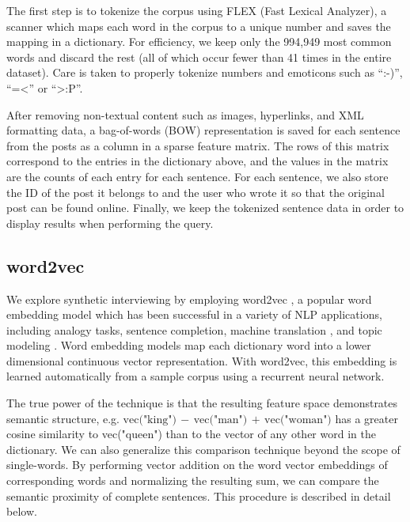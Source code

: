 \documentclass{sigchi}
\begin{document}
The first step is to tokenize the corpus using FLEX (Fast Lexical Analyzer), a scanner which maps each word in the corpus to a unique number and saves the mapping in a dictionary. For efficiency, we keep only the 994,949 most common words and discard the rest (all of which occur fewer than 41 times in the entire dataset). Care is taken to properly tokenize numbers and emoticons such as ``:-)'', ``=<'' or ``>:P''.

After removing non-textual content such as images, hyperlinks, and XML formatting data, a bag-of-words (BOW) representation is saved for each sentence from the posts as a column in a sparse feature matrix. The rows of this matrix correspond to the entries in the dictionary above, and the values in the matrix are the counts of each entry for each sentence. For each sentence, we also store the ID of the post it belongs to and the user who wrote it so that the original post can be found online. Finally, we keep the tokenized sentence data in order to display results when performing the query.


\subsection{word2vec}
We explore synthetic interviewing by employing word2vec \cite{Mikolov2013,MikolovSCCD13}, a popular word embedding model which has been successful in a variety of NLP applications, including analogy tasks, sentence completion, machine translation \cite{W15-4908}, and topic modeling \cite{djuric2015hierarchical}. Word embedding models map each dictionary word into a lower dimensional continuous vector representation. With word2vec, this embedding is learned automatically from a sample corpus using a recurrent neural network. 

The true power of the technique is that the resulting feature space demonstrates semantic structure, e.g. $\text{vec("king")}\,{-}\, \text{vec("man")}\,{+}\,\text{vec("woman")}$ has a greater cosine similarity to vec("queen") than to the vector of any other word in the dictionary. We can also generalize this comparison technique beyond the scope of single-words. By performing vector addition on the word vector embeddings of corresponding words and normalizing the resulting sum, we can compare the semantic proximity of complete sentences. This procedure is described in detail below.
\end{document}
